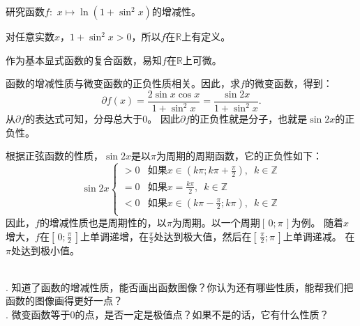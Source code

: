 \documentclass[12pt,UTF8,fontset=none]{ctexbook}
\begin{document}
\begin{et}
    研究函数$f:\,\,x\mapsto \ln(1 + \sin^2{x})$的增减性。
\end{et}

\begin{so}
    对任意实数$x$，$1 + \sin^2{x} > 0$，所以$f$在$\mathbb{R}$上有定义。

    作为基本显式函数的复合函数，易知$f$在$\mathbb{R}$上可微。

    函数的增减性质与微变函数的正负性质相关。因此，求$f$的微变函数，得到：
    $$ \partial f(x) = \frac{2\sin{x}\cos{x}}{1 + \sin^2{x}} = \frac{\sin{2x}}{1 + \sin^2{x}}.$$
    从$ \partial f $的表达式可知，分母总大于$0$。
    因此$ \partial f $的正负性就是分子，也就是$\sin{2x}$的正负性。

    根据正弦函数的性质，$\sin{2x}$是以$\pi$为周期的周期函数，它的正负性如下：
    $$ \sin{2x} \left\{
        \begin{array}{cl}
            > 0 & \mbox{如果}x \in (k\pi; k\pi + \frac{\pi}{2}),\,\,\, k\in\mathbb{Z} \\
            = 0 & \mbox{如果}x = \frac{k\pi}{2}, \,\,\,k\in\mathbb{Z} \\
            < 0 & \mbox{如果}x \in (k\pi - \frac{\pi}{2}; k\pi), \,\,\,k\in\mathbb{Z} \\
        \end{array}\right.
    $$
    因此，$f$的增减性质也是周期性的，以$\pi$为周期。以一个周期$[\,0; \pi\,]$为例。
    随着$x$增大，$f$在$[\,0; \frac{\pi}{2}\,]$上单调递增，在$\frac{\pi}{2}$处达到极大值，然后在$[\,\frac{\pi}{2}; \pi\,]$上单调递减。
    在$\pi$处达到极小值。
    
\end{so}

\begin{sk}
    \mbox{} \\
    . 知道了函数的增减性质，能否画出函数图像？你认为还有哪些性质，能帮我们把函数的图像画得更好一点？\\
    . 微变函数等于$0$的点，是否一定是极值点？如果不是的话，它有什么性质？    
\end{sk}
\end{document}
